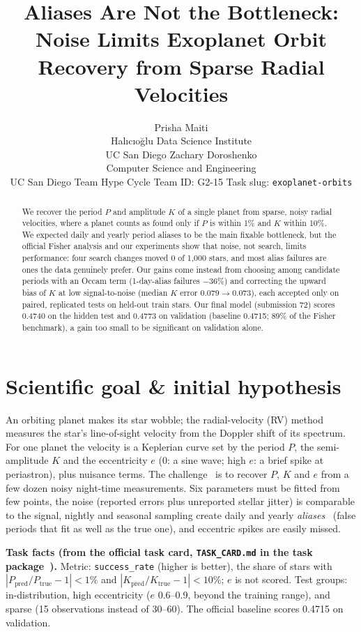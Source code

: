 \documentclass{article}
\title{Aliases Are Not the Bottleneck: Noise Limits Exoplanet Orbit Recovery from Sparse Radial Velocities}
\author{Prisha Maiti \\ Hal\i c\i o\u{g}lu Data Science Institute \\ UC San Diego
\And Zachary Doroshenko \\ Computer Science and Engineering \\ UC San Diego
\AND Team Hype Cycle \quad Team ID: G2-15 \quad Task slug: \texttt{exoplanet-orbits}}
\begin{document}
\maketitle

\begin{abstract}
We recover the period $P$ and amplitude $K$ of a single planet from sparse,
noisy radial velocities, where a planet counts as found only if $P$ is
within 1\% and $K$ within 10\%. We expected daily and yearly period aliases
to be the main fixable bottleneck, but the official Fisher analysis and our
experiments show that noise, not search, limits performance: four search
changes moved 0 of 1,000 stars, and most alias failures are ones the data
genuinely prefer. Our gains come instead from choosing among candidate
periods with an Occam term (1-day-alias failures $-$36\%) and correcting
the upward bias of $K$ at low signal-to-noise (median $K$ error
0.079$\to$0.073), each accepted only on paired, replicated tests on
held-out train stars. Our final model (submission 72) scores 0.4740 on the
hidden test and 0.4773 on validation (baseline 0.4715; 89\% of the Fisher
benchmark), a gain too small to be significant on validation alone.
\end{abstract}

\section{Scientific goal \& initial hypothesis}
An orbiting planet makes its star wobble; the radial-velocity (RV) method
measures the star's line-of-sight velocity from the Doppler shift of its
spectrum. For one planet the velocity is a Keplerian curve set by the period
$P$, the semi-amplitude $K$ and the eccentricity $e$ (0: a sine wave; high
$e$: a brief spike at periastron), plus nuisance terms. The
challenge~\cite{challenge} is to recover $P$, $K$ and $e$ from a few dozen
noisy night-time measurements. Six parameters must be fitted from few
points, the noise (reported errors plus unreported stellar jitter) is
comparable to the signal, nightly and seasonal sampling create daily and
yearly \emph{aliases}~\cite{dawson2010} (false periods that fit as well as the true one), and
eccentric spikes are easily missed.

\textbf{Task facts (from the official task card, \texttt{TASK\_CARD.md} in the task package~\cite{galileo2026}).}
Metric: \texttt{success\_rate} (higher is better), the share of stars with
$|P_\text{pred}/P_\text{true}-1|<1\%$ and $|K_\text{pred}/K_\text{true}-1|<10\%$;
$e$ is not scored. Test groups: in-distribution, high eccentricity
($e$ 0.6--0.9, beyond the training range), and sparse (15 observations
instead of 30--60). The official baseline scores 0.4715 on validation.
\end{document}
